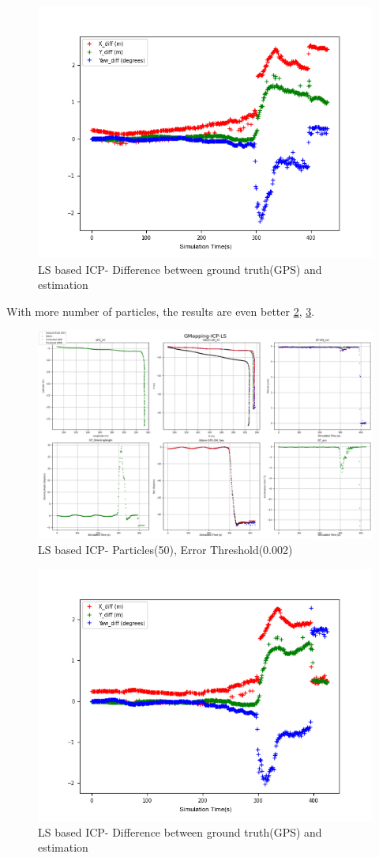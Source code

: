     \begin{figure}[h] 
        \includegraphics[height=0.4\textwidth]{images/GMapping-ICP-LS_True_vs_Crct_20_0.002.png}
        \caption{LS based ICP- Difference between ground truth(GPS) and estimation}
        \label{fig:LS_20_0.002_diff}
    \end{figure}
\clearpage
With more number of particles, the results are even better \ref{fig:LS_50_0.002}, \ref{fig:LS_50_0.002_diff}.
    \begin{figure}[h] 
        \includegraphics[height=0.6\textwidth]{images/GMapping-ICP-LS_Map_50_0.002.png}
        \caption{LS based ICP- Particles(50), Error Threshold(0.002)}
        \label{fig:LS_50_0.002}
    \end{figure}
    \begin{figure}[h] 
        \includegraphics[height=0.4\textwidth]{images/GMapping-ICP-LS_True_vs_Crct_50_0.002.png}
        \caption{LS based ICP- Difference between ground truth(GPS) and estimation}
        \label{fig:LS_50_0.002_diff}
    \end{figure}
\clearpage

